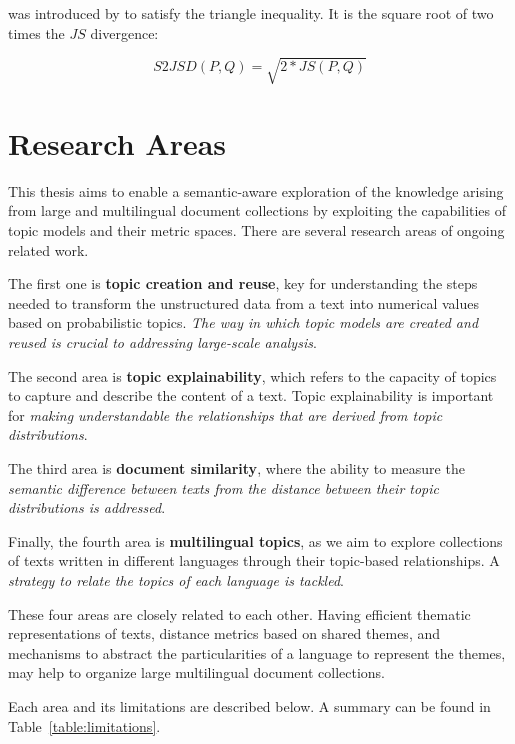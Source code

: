  was introduced by \citep{Endres2003} to satisfy the triangle inequality. It is the square root of two times the $JS$ divergence:

\begin{equation}
    S2JSD(P,Q) = \sqrt{2*JS(P,Q)}
\label{eq:s2jsd}
\end{equation}

\section{Research Areas}

This thesis aims to enable a semantic-aware exploration of the knowledge arising from large and multilingual document collections by exploiting the capabilities of topic models and their metric spaces. There are several research areas of ongoing related work. 

The first one is \textbf{topic creation and reuse}, key for understanding the steps needed to transform the unstructured data from a text into numerical values based on probabilistic topics. \textit{The way in which topic models are created and reused is crucial to addressing large-scale analysis}. 

The second area is \textbf{topic explainability}, which refers to the capacity of topics to capture and describe the content of a text. Topic explainability is important for \textit{making understandable the relationships that are derived from topic distributions}. 

The third area is \textbf{document similarity}, where the ability to measure the \textit{semantic difference between texts from the distance between their topic distributions is addressed}. 

Finally, the fourth area is \textbf{multilingual topics}, as we aim to explore collections of texts written in different languages through their topic-based relationships. A \textit{strategy to relate the topics of each language is tackled}. 

These four areas are closely related to each other. Having efficient thematic representations of texts, distance metrics based on shared themes, and mechanisms to abstract the particularities of a language to represent the themes, may help to organize large multilingual document collections.

Each area and its limitations are described below. A summary can be found in Table~\ref{table:limitations}.

